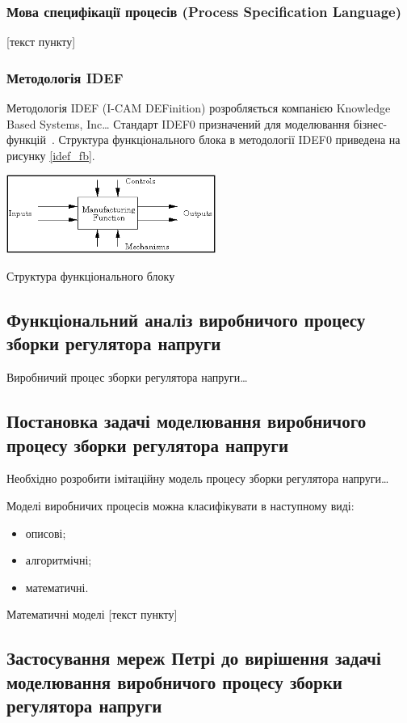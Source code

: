\subsubsection{Мова специфікації процесів (Process Specification Language)}
[текст пункту]
\subsubsection{Методологія IDEF}
Методологія IDEF (I-CAM DEFinition) розробляється компанією Knowledge Based Systems, Inc\ldots
Стандарт IDEF0 призначений для моделювання
бізнес-функцій~\cite{Sommerville_2010}. Структура функціонального блока в методології IDEF0 приведена на рисунку
\ref{idef_fb}.

\begin{stdfigure}
\includegraphics[width=2.7in]{images/idef_fb.png}
\caption{Структура функціонального блоку}
\label{idef_fb}
\end{stdfigure}

\subsection{Функціональний аналіз виробничого процесу зборки регулятора напруги}

Виробничий процес зборки регулятора напруги\ldots

\subsection{Постановка задачі моделювання виробничого процесу зборки регулятора
напруги}

Необхідно розробити імітаційну модель процесу зборки регулятора напруги\ldots

Моделі виробничих процесів можна класифікувати в наступному виді:
\begin{itemize}
\item описові;
\item алгоритмічні;
\item математичні.
\end{itemize}

Математичні моделі [текст пункту]


\subsection{Застосування мереж Петрі до вирішення задачі моделювання
виробничого процесу зборки регулятора напруги} 

